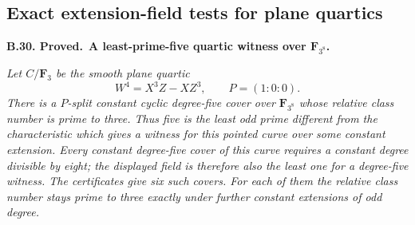 \documentclass[11pt,a4paper]{article}
\newenvironment{claim}[3]{\par\medskip\noindent\hypertarget{#1}{\textbf{#1. #2.}}\ \textbf{#3.}\par\nopagebreak\smallskip\begingroup\itshape}{\endgroup\par\smallskip}
\begin{document}
\subsection{Exact extension-field tests for plane quartics}

\begin{claim}{B.30}{Proved}{A least-prime-five quartic witness over \(\mathbf F_{3^8}\)}
Let $C/\mathbf F_3$ be the smooth plane quartic
\[
                W^4=X^3Z-XZ^3,\qquad P=(1:0:0).
\]
There is a $P$-split constant cyclic degree-five cover over
$\mathbf F_{3^8}$ whose relative class number is prime to three.
Thus five is the least odd prime different from the characteristic
which gives a witness for this pointed curve over some constant
extension. Every constant degree-five cover of this curve requires
a constant degree divisible by eight; the displayed field is
therefore also the least one for a degree-five witness.
The certificates give six such covers. For each of them the
relative class number stays prime to three exactly under further
constant extensions of odd degree.
\end{claim}
\end{document}
